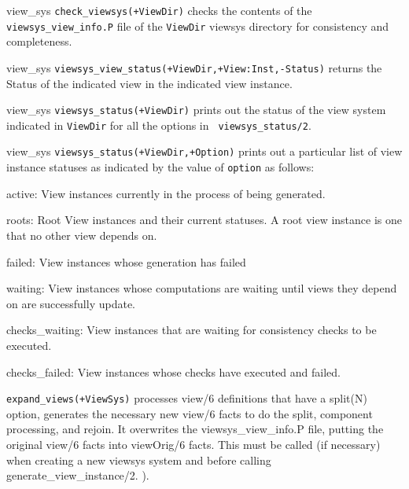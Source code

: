 \begin{description}
{view\_sys}
%
  {\tt check\_viewsys(+ViewDir)} checks the contents of the {\tt
    viewsys\_view\_info.P} file of the {\tt ViewDir} viewsys directory
  for consistency and completeness.

{view\_sys}
{\tt viewsys\_view\_status(+ViewDir,+View:Inst,-Status)} returns the
Status of the indicated view in the indicated view instance.

{view\_sys}
%
{\tt viewsys\_status(+ViewDir)} prints out the status of the view
system indicated in {\tt ViewDir} for all the options in {\tt
  viewsys\_status/2}.

{view\_sys}
%
  {\tt viewsys\_status(+ViewDir,+Option)} prints out a particular list
  of view instance statuses as indicated by the value of {\tt option}
  as follows:

\begin{description}

\item{active:} View instances currently in the process of being
generated.

\item{roots:} Root View instances and their current statuses.  A root
view instance is one that no other view depends on.

\item{failed:} View instances whose generation has failed

\item{waiting:} View instances whose computations are waiting until
views they depend on are successfully update.

\item{checks\_waiting:} View instances that are waiting for consistency
checks to be executed.

\item{checks\_failed:} View instances whose checks have executed and
failed.

\end{description}

{\tt expand\_views(+ViewSys)}
processes view/6 definitions that have a split(N) option, generates
the necessary new view/6 facts to do the split, component processing,
and rejoin.  It overwrites the viewsys\_view\_info.P file, putting the
original view/6 facts into viewOrig/6 facts.  This must be called (if
necessary) when creating a new viewsys system and before calling
generate\_view\_instance/2.  ).


\end{description}

